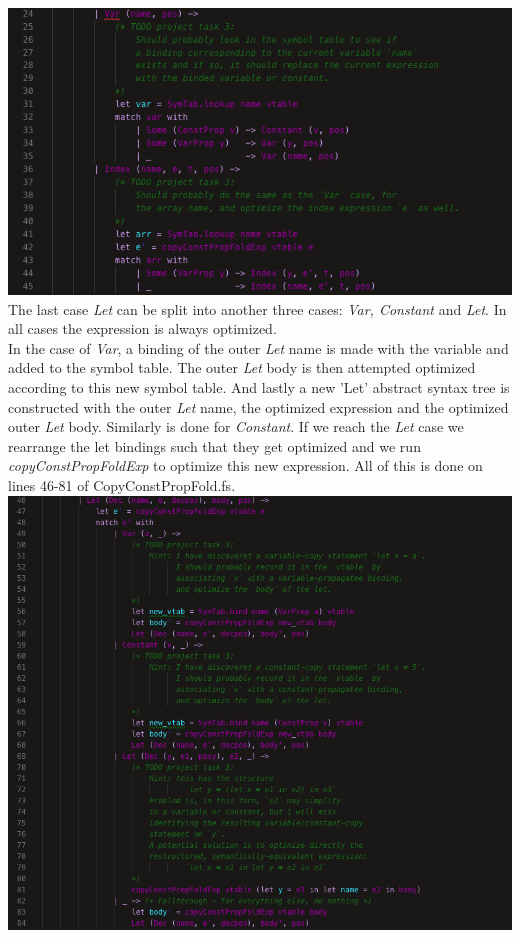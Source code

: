 \includegraphics[width=\linewidth]{Materials/Optimization/VarIndex}\\
The last case \textit{Let} can be split into another three cases: \textit{Var, Constant} and \textit{Let}. In all cases the expression is always optimized.\\
In the case of \textit{Var}, a binding of the outer \textit{Let} name is made with the variable and added to the symbol table. The outer \textit{Let} body is then attempted optimized according to this new symbol table. And lastly a new 'Let' abstract syntax tree is constructed with the outer \textit{Let} name, the optimized expression and the optimized outer \textit{Let} body. Similarly is done for \textit{Constant}. If we reach the \textit{Let} case we rearrange the let bindings such that they get optimized and we run \textit{copyConstPropFoldExp} to optimize this new expression. All of this is done on lines 46-81 of CopyConstPropFold.fs.\\
\includegraphics[width=\linewidth]{Materials/Optimization/Let}